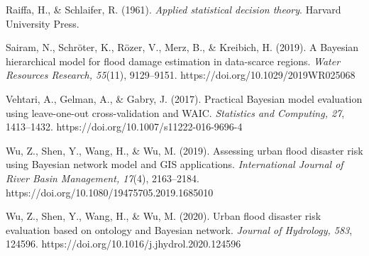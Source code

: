 \documentclass[
]{article}
\begin{document}
Raiffa, H., \& Schlaifer, R. (1961). \emph{Applied statistical decision
theory}. Harvard University Press.

Sairam, N., Schröter, K., Rözer, V., Merz, B., \& Kreibich, H. (2019). A
Bayesian hierarchical model for flood damage estimation in data-scarce
regions. \emph{Water Resources Research, 55}(11), 9129--9151.
https://doi.org/10.1029/2019WR025068

Vehtari, A., Gelman, A., \& Gabry, J. (2017). Practical Bayesian model
evaluation using leave-one-out cross-validation and WAIC.
\emph{Statistics and Computing, 27}, 1413--1432.
https://doi.org/10.1007/s11222-016-9696-4

Wu, Z., Shen, Y., Wang, H., \& Wu, M. (2019). Assessing urban flood
disaster risk using Bayesian network model and GIS applications.
\emph{International Journal of River Basin Management, 17}(4),
2163--2184. https://doi.org/10.1080/19475705.2019.1685010

Wu, Z., Shen, Y., Wang, H., \& Wu, M. (2020). Urban flood disaster risk
evaluation based on ontology and Bayesian network. \emph{Journal of
Hydrology, 583}, 124596. https://doi.org/10.1016/j.jhydrol.2020.124596
\end{document}
